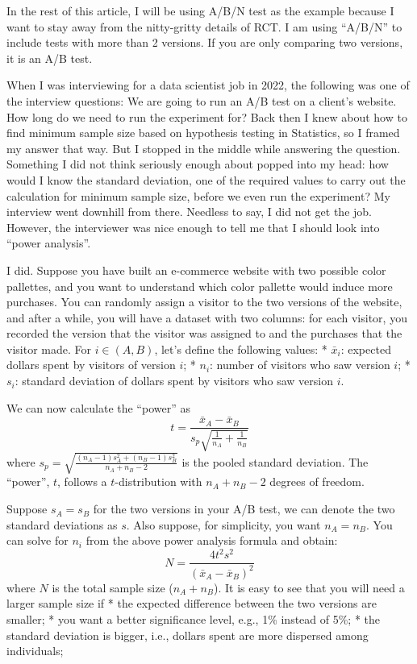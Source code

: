 \documentclass[
]{book}
\theoremstyle{definition}
\theoremstyle{definition}
\theoremstyle{definition}
\theoremstyle{definition}
\theoremstyle{remark}
\begin{document}
In the rest of this article, I will be using A/B/N test as the example because I want to stay away from the nitty-gritty details of RCT. I am using ``A/B/N'' to include tests with more than 2 versions. If you are only comparing two versions, it is an A/B test.

When I was interviewing for a data scientist job in 2022, the following was one of the interview questions: We are going to run an A/B test on a client's website. How long do we need to run the experiment for? Back then I knew about how to find minimum sample size based on hypothesis testing in Statistics, so I framed my answer that way. But I stopped in the middle while answering the question. Something I did not think seriously enough about popped into my head: how would I know the standard deviation, one of the required values to carry out the calculation for minimum sample size, before we even run the experiment? My interview went downhill from there. Needless to say, I did not get the job. However, the interviewer was nice enough to tell me that I should look into ``power analysis''.

I did. Suppose you have built an e-commerce website with two possible color pallettes, and you want to understand which color pallette would induce more purchases. You can randomly assign a visitor to the two versions of the website, and after a while, you will have a dataset with two columns: for each visitor, you recorded the version that the visitor was assigned to and the purchases that the visitor made. For \(i\in(A,B)\), let's define the following values:
* \(\bar{x}_i\): expected dollars spent by visitors of version \(i\);
* \(n_i\): number of visitors who saw version \(i\);
* \(s_i\): standard deviation of dollars spent by visitors who saw version \(i\).

We can now calculate the ``power'' as
\[t=\frac{\bar{x}_A-\bar{x}_B}{s_p\sqrt{\tfrac{1}{n_A}+\tfrac{1}{n_B}}}\]
where \(s_p=\sqrt{\frac{(n_A-1)s_A^2+(n_B-1)s_B^2}{n_A+n_B-2}}\) is the pooled standard deviation. The ``power'', \(t\), follows a \(t\)-distribution with \(n_A+n_B-2\) degrees of freedom.

Suppose \(s_A=s_B\) for the two versions in your A/B test, we can denote the two standard deviations as \(s\). Also suppose, for simplicity, you want \(n_A=n_B\). You can solve for \(n_i\) from the above power analysis formula and obtain:
\[N=\frac{4t^2s^2}{(\bar{x}_A-\bar{x}_B)^2}\]
where \(N\) is the total sample size (\(n_A+n_B\)). It is easy to see that you will need a larger sample size if
* the expected difference between the two versions are smaller;
* you want a better significance level, e.g., 1\% instead of 5\%;
* the standard deviation is bigger, i.e., dollars spent are more dispersed among individuals;
\end{document}
